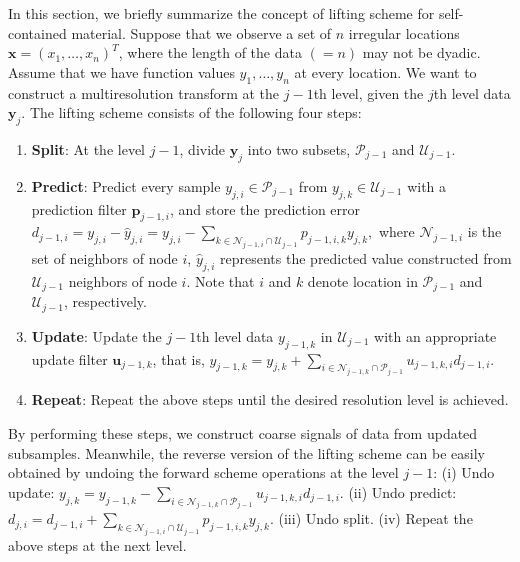 \documentclass[11pt,titlepage]{article}
\begin{document}
In this section, we briefly summarize the concept of lifting scheme for self-contained material. Suppose that we observe a set of $n$ irregular locations $\bm{x}=(x_{1},\ldots, x_{n})^{T}$, where the length of the data $(=n)$ may not be dyadic. Assume that we have function values $y_1,\ldots, y_n$ at every location. We want to construct a multiresolution transform at the $j-1$th level, given the $j$th level data $\bm{y}_{j}$. The lifting scheme consists of the following four steps:
\begin{enumerate}
\item \textbf{Split}: At the level $j-1$, divide $\bm{y}_{j}$ into two subsets, $\mathcal{P}_{j-1}$ and $\mathcal{U}_{j-1}$. 

\item \textbf{Predict}: Predict every sample $y_{j,i}\in\mathcal{P}_{j-1}$ from $y_{j,k}\in\mathcal{U}_{j-1}$ with a prediction filter $\mathbf{p}_{j-1,i}$, and store the prediction error $d_{j-1,i} = y_{j,i} - \hat{y}_{j,i} = y_{j,i} - \sum_{k \in \mathcal{N}_{j-1,i}\cap \mathcal{U}_{j-1}}p_{j-1,i,k}y_{j,k},$ where $\mathcal{N}_{j-1,i}$ is the set of neighbors of node $i$, $\hat{y}_{j,i}$ represents the predicted value constructed from $\mathcal{U}_{j-1}$ neighbors of node $i$. Note that $i$ and $k$ denote location in $\mathcal{P}_{j-1}$ and $\mathcal{U}_{j-1}$, respectively. 

\item \textbf{Update}: Update  the $j-1$th level data $y_{j-1,k}$ in $\mathcal{U}_{j-1}$ with an appropriate update filter $\mathbf{u}_{j-1,k}$, that is, 
	$y_{j-1,k} = y_{j,k}+\sum_{i\in\mathcal{N}_{j-1,k}\cap \mathcal{P}_{j-1}}u_{j-1,k,i}d_{j-1,i}.$ 
	
\item \textbf{Repeat}: Repeat the above steps until the desired resolution level is achieved.
\end{enumerate}

By performing these steps, we construct coarse signals of data from updated subsamples. Meanwhile, the reverse version of the lifting scheme can be easily obtained by undoing the forward scheme operations at the level $j-1$: (i) Undo update: $ y_{j,k} = y_{j-1,k} - \sum_{i\in\mathcal{N}_{j-1,k}\cap \mathcal{P}_{j-1}}u_{j-1,k,i}d_{j-1,i}.$ (ii) Undo predict: $d_{j,i} = d_{j-1,i} + \sum_{k\in\mathcal{N}_{j-1,i}\cap \mathcal{U}_{j-1}}p_{j-1,i,k}y_{j,k}.$ (iii) Undo split. (iv) Repeat the above steps at the next level.
\end{document}
